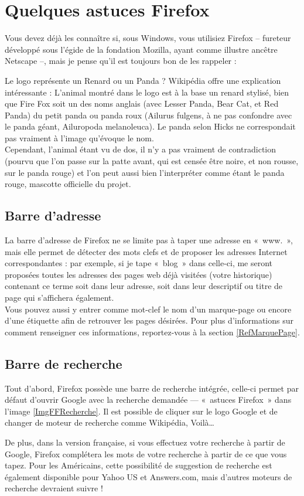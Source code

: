 \section{Quelques astuces Firefox}
\label{RefFF}
Vous devez déjà les connaître si, sous Windows, vous utilisiez Firefox -- fureteur développé sous l'égide de la fondation Mozilla, ayant comme illustre ancêtre Netscape --, mais je pense qu'il est toujours bon de les rappeler :
\begin{citationlongue}{Le logo représente un Renard ou un Panda ? Wikipédia offre une explication intéressante :}
L'animal montré dans le logo est à la base un renard stylisé, bien que Fire Fox soit un des noms anglais (avec Lesser Panda, Bear Cat, et Red Panda) du petit panda ou panda roux (Ailurus fulgens, à ne pas confondre avec le panda géant, Ailuropoda melanoleuca). Le panda selon Hicks ne correspondait pas vraiment à l'image qu'évoque le nom.\\ Cependant, l'animal étant vu de dos, il n'y a pas vraiment de contradiction (pourvu que l'on passe sur la patte avant, qui est censée être noire, et non rousse, sur le panda rouge) et l'on peut aussi bien l'interpréter comme étant le panda rouge, mascotte officielle du projet.
\end{citationlongue}
\subsection{Barre d'adresse}
\label{RefBarreAdresse}
La barre d'adresse de Firefox ne se limite pas à taper une adresse en «~www.~», mais elle permet de détecter des mots clefs et de proposer les adresses Internet correspondantes : par exemple, si je tape «~blog~» dans celle-ci, me seront proposées toutes les adresses des pages web déjà visitées (votre historique) contenant ce terme soit dans leur adresse, soit dans leur descriptif ou titre de page qui s'affichera également.\\
Vous pouvez aussi y entrer comme mot-clef le nom d'un marque-page ou encore d'une étiquette afin de retrouver les pages désirées. Pour plus d'informations sur comment renseigner ces informations, reportez-vous à la section \ref{RefMarquePage}.\par
\subsection{Barre de recherche}
Tout d'abord, Firefox possède une barre de recherche intégrée, celle-ci permet par défaut d'ouvrir Google avec la recherche demandée --- «~astuces Firefox~» dans l'image \ref{ImgFFRecherche}. Il est possible de cliquer sur le logo Google et de changer de moteur de recherche comme Wikipédia, Voilà\ldots{}\par
{}
De plus, dans la version française, si vous effectuez votre recherche à partir de Google, Firefox complétera les mots de votre recherche à partir de ce que vous tapez. Pour les Américains, cette possibilité de suggestion de recherche est également disponible pour Yahoo US et Answers.com, mais d'autres moteurs de recherche devraient suivre !
